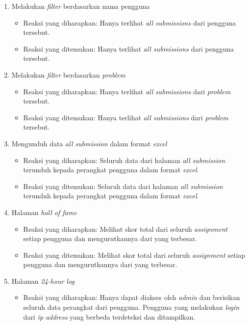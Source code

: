 \begin{enumerate}
\begin{itemize}
	 \end{itemize}
	 \item Melakukan \textit{filter} berdasarkan nama pengguna
	 \begin{itemize}
	 	\item Reaksi yang diharapkan: Hanya terlihat \textit{all submissions} dari pengguna tersebut.
	 	\item Reaksi yang ditemukan: Hanya terlihat \textit{all submissions} dari pengguna tersebut.
	 \end{itemize}
	 \item Melakukan \textit{filter} berdasarkan \textit{problem}
	 \begin{itemize}
	 	\item Reaksi yang diharapkan: Hanya terlihat \textit{all submissions} dari \textit{problem} tersebut.
	 	\item Reaksi yang ditemukan: Hanya terlihat \textit{all submissions} dari \textit{problem} tersebut.
	 \end{itemize}
	 \item Mengunduh data \textit{all submission} dalam format \textit{excel}
	 \begin{itemize}
	 	\item Reaksi yang diharapkan: Seluruh data dari halaman \textit{all submission} terunduh kepada perangkat pengguna dalam format \textit{excel}.
	 	\item Reaksi yang ditemukan: Seluruh data dari halaman \textit{all submission} terunduh kepada perangkat pengguna dalam format \textit{excel}.
	 \end{itemize}
	 \item Halaman \textit{hall of fame}
	 \begin{itemize}
	 	\item Reaksi yang diharapkan: Melihat skor total dari seluruh \textit{assignment} setiap pengguna dan mengurutkannya dari yang terbesar.
	 	\item Reaksi yang ditemukan: Melihat skor total dari seluruh \textit{assignment} setiap pengguna dan mengurutkannya dari yang terbesar.
	 \end{itemize}
	 \item Halaman \textit{24-hour log}
	 \begin{itemize}
	 	\item Reaksi yang diharapkan: Hanya dapat diakses oleh \textit{admin} dan berisikan seluruh data perangkat dari pengguna. Pengguna yang melakukan \textit{login} dari \textit{ip address} yang berbeda terdeteksi dan ditampilkan.

\end{itemize}
\end{enumerate}
